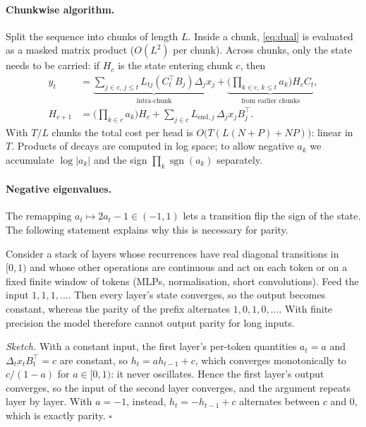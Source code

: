 \paragraph{Chunkwise algorithm.} Split the sequence into chunks of length $L$. Inside a chunk, \eqref{eq:dual}
is evaluated as a masked matrix product ($O(L^2)$ per chunk). Across chunks, only the state needs to be
carried: if $H_c$ is the state entering chunk $c$, then
\begin{align}
  y_t &= \underbrace{\textstyle\sum_{j\in c,\,j\le t} L_{tj}(C_t^\top B_j)\Delta_j x_j}_{\text{intra-chunk}}
      + \underbrace{\Big(\textstyle\prod_{k\in c,\,k\le t} a_k\Big) H_c C_t}_{\text{from earlier chunks}}, \label{eq:chunk}\\
  H_{c+1} &= \Big(\textstyle\prod_{k\in c} a_k\Big) H_c + \textstyle\sum_{j\in c} L_{\mathrm{end},j}\,\Delta_j x_j B_j^\top . \nonumber
\end{align}
With $T/L$ chunks the total cost per head is $O\big(T(L(N+P) + NP)\big)$: linear in $T$. Products of decays
are computed in log space; to allow negative $a_k$ we accumulate $\log|a_k|$ and the sign $\prod_k
\operatorname{sgn}(a_k)$ separately.

\paragraph{Negative eigenvalues.} The remapping $a_t\mapsto 2a_t-1\in(-1,1)$ \citep{grazzi2025unlocking} lets a
transition flip the sign of the state. The following statement explains why this is necessary for parity.

\begin{proposition}
Consider a stack of layers whose recurrences have real diagonal transitions in $[0,1)$ and whose other
operations are continuous and act on each token or on a fixed finite window of tokens (MLPs, normalisation,
short convolutions). Feed the input $1,1,1,\dots$. Then every layer's state
converges, so the output becomes constant, whereas the parity of the prefix alternates
$1,0,1,0,\dots$. With finite precision the model therefore cannot output parity for long inputs.
\end{proposition}
\emph{Sketch.} With a constant input, the first layer's per-token quantities $a_t=a$ and $\Delta_t x_t B_t^\top = c$
are constant, so $h_t = a h_{t-1} + c$, which converges monotonically to $c/(1-a)$ for $a\in[0,1)$: it never
oscillates. Hence the first layer's output converges, so the input of the second layer converges, and the
argument repeats layer by layer. With $a=-1$, instead, $h_t = -h_{t-1}+c$ alternates between $c$ and $0$,
which is exactly parity. $\square$

